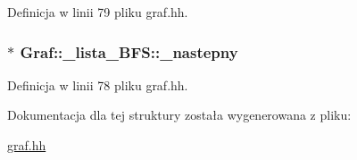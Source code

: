 \-Definicja w linii 79 pliku graf.\-hh.

\hypertarget{struct_graf_1_1__lista___b_f_s_ad101a4841ac1d7c783fc24c4ef6790c1}{
\subsubsection[{\-\_\-nastepny}]{$\ast$ {\bf \-Graf\-::\-\_\-lista\-\_\-\-B\-F\-S\-::\-\_\-nastepny}}}\label{struct_graf_1_1__lista___b_f_s_ad101a4841ac1d7c783fc24c4ef6790c1}


\-Definicja w linii 78 pliku graf.\-hh.



\-Dokumentacja dla tej struktury została wygenerowana z pliku\-:\begin{DoxyCompactItemize}
\item 
\hyperlink{graf_8hh}{graf.\-hh}\end{DoxyCompactItemize}
